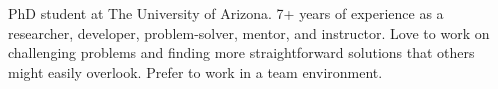 

\begin{cvparagraph}

PhD student at The University of Arizona. 7+ years of experience as a researcher, developer, problem-solver, mentor, and instructor. Love to work on challenging problems and finding more straightforward solutions that others might easily overlook. Prefer to work in a team environment.
\end{cvparagraph}

